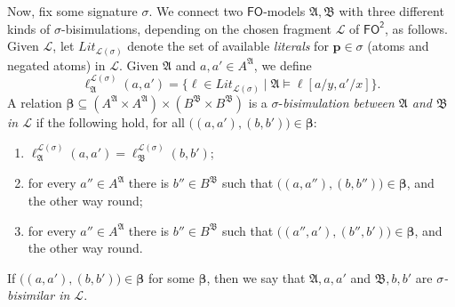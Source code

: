 \documentclass[10pt,a4paper]{amsart}
\theoremstyle{plain}
\theoremstyle{definition}
\newcommand{\FO}{\ensuremath{\mathsf{FO}}}
\newcommand{\FOT}{\ensuremath{\mathsf{FO^2}}}
\newcommand{\bs}{\boldsymbol{\beta}}
\newcommand{\fform}[1]{\boldsymbol{#1}}
\newcommand{\pvar}{\fform{p}}
\begin{document}
\begin{appendix}
Now, fix some signature $\sigma$.
We connect two \FO-models $\mathfrak A,\mathfrak B$ with three different kinds of $\sigma$-bisimulations,
depending on the chosen fragment $\mathcal L$ of \FOT{}, as follows.
Given $\mathcal{L}$, let $\textit{Lit}_{\mathcal{L}(\sigma)}$ denote the set of available \emph{literals} for $\pvar\in\sigma$ (atoms and negated atoms) in $\mathcal{L}$.
Given $\mathfrak A$ and $a,a'\in A^\mathfrak A$, we define 
%
\[
\ell_{\mathfrak A}^{\mathcal{L}(\sigma)}(a,a')=\bigl\{\ell\in \textit{Lit}_{\mathcal{L}(\sigma)} \mid \mathfrak A\models\ell[a/y,a'/x]\bigr\}.
\]
%
A relation $\bs\subseteq (A^\mathfrak A\times A^\mathfrak A)\times (B^\mathfrak B\times B^\mathfrak B) $
is a $\sigma$-\emph{bisimulation between $\mathfrak A$ and $\mathfrak B$ in $\mathcal{L}$} if the following hold,
for all $\bigl((a,a'),(b,b')\bigr)\in\bs$:
%
\begin{enumerate}
\item
$\ell_{\mathfrak A}^{\mathcal{L}(\sigma)}(a,a')=\ell_{\mathfrak B}^{\mathcal{L}(\sigma)}(b,b')$;
\item
for every $a''\in A^\mathfrak A$ there is $b''\in B^\mathfrak B$ such that $\bigl((a,a''),(b,b'')\bigr)\in\bs$, and the other way round;
\item
for every $a''\in A^\mathfrak A$ there is $b''\in B^\mathfrak B$ such that $\bigl((a'',a'),(b'',b')\bigr)\in\bs$, and the other way round.
\end{enumerate}
%
If $\bigl((a,a'),(b,b')\bigr)\in\bs$ for some $\bs$, then we say that $\mathfrak A,a,a'$ and $\mathfrak B,b,b'$ are \emph{$\sigma$-bisimilar in $\mathcal{L}$\/}.


\end{appendix}
\end{document}
